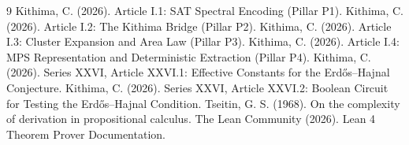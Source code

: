 \documentclass[11pt,a4paper]{article}
\begin{document}

\begin{thebibliography}{9}
  Kithima, C. (2026). Article I.1: SAT Spectral Encoding (Pillar P1).
  Kithima, C. (2026). Article I.2: The Kithima Bridge (Pillar P2).
  Kithima, C. (2026). Article I.3: Cluster Expansion and Area Law (Pillar P3).
  Kithima, C. (2026). Article I.4: MPS Representation and Deterministic Extraction (Pillar P4).
  Kithima, C. (2026). Series XXVI, Article XXVI.1: Effective Constants for the Erdős–Hajnal Conjecture.
  Kithima, C. (2026). Series XXVI, Article XXVI.2: Boolean Circuit for Testing the Erdős–Hajnal Condition.
  Tseitin, G. S. (1968). On the complexity of derivation in propositional calculus.
  The Lean Community (2026). Lean 4 Theorem Prover Documentation.
\end{thebibliography}
\end{document}
